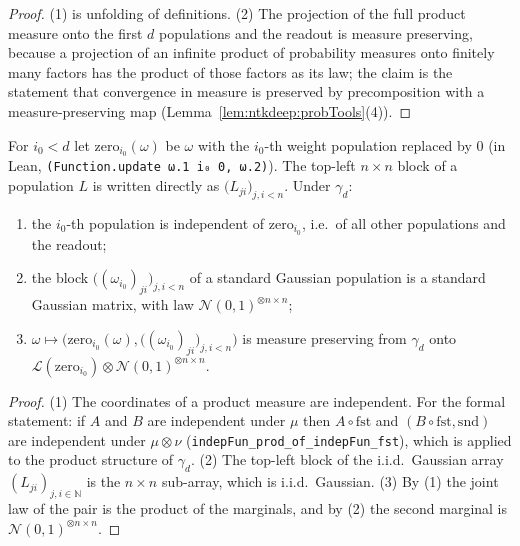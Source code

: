 \begin{proof}
  \leanok
(1) is unfolding of definitions. (2) The projection of the full product measure onto the first $d$ populations and the readout is measure preserving, because a projection of an infinite product of probability measures onto finitely many factors has the product of those factors as its law; the claim is the statement that convergence in measure is preserved by precomposition with a measure-preserving map (Lemma~\ref{lem:ntkdeep:probTools}(4)).
\end{proof}

\begin{theorem}\label{thm:ntkdn:layerSplit}
  \leanok
For $i_0<d$ let $\mathrm{zero}_{i_0}(\omega)$ be $\omega$ with the $i_0$-th weight population
replaced by $0$ (in Lean, \texttt{(Function.update ω.1 i₀ 0, ω.2)}). The top-left $n\times n$
block of a population $L$ is written directly as $\bigl(L_{ji}\bigr)_{j,i<n}$. Under $\gamma_d$:
\begin{enumerate}
  \item the $i_0$-th population is independent of $\mathrm{zero}_{i_0}$, i.e.\ of all other populations and the readout;
  \item the block $\bigl((\omega_{i_0})_{ji}\bigr)_{j,i<n}$ of a standard Gaussian population
    is a standard Gaussian matrix, with law $\mathcal N(0,1)^{\otimes n\times n}$;
  \item $\omega\mapsto\bigl(\mathrm{zero}_{i_0}(\omega),
    \bigl((\omega_{i_0})_{ji}\bigr)_{j,i<n}\bigr)$ is measure preserving from $\gamma_d$ onto
    $\mathcal L(\mathrm{zero}_{i_0})\otimes\mathcal N(0,1)^{\otimes n\times n}$.
\end{enumerate}
\end{theorem}

\begin{proof}
  \leanok
(1) The coordinates of a product measure are independent. For the formal statement: if $A$ and $B$ are independent under $\mu$ then $A\circ\mathrm{fst}$ and $(B\circ\mathrm{fst},\mathrm{snd})$ are independent under $\mu\otimes\nu$ (\texttt{indepFun\_prod\_of\_indepFun\_fst}), which is applied to the product structure of $\gamma_d$. (2) The top-left block of the i.i.d.\ Gaussian array $(L_{ji})_{j,i\in\mathbb N}$ is the $n\times n$ sub-array, which is i.i.d.\ Gaussian. (3) By (1) the joint law of the pair is the product of the marginals, and by (2) the second marginal is $\mathcal N(0,1)^{\otimes n\times n}$.
\end{proof}

